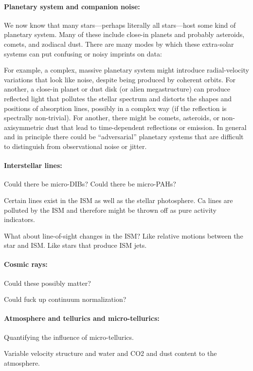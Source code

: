 \documentclass[12pt, fullpage, letterpaper]{article}
\begin{document}
\paragraph{Planetary system and companion noise:}
We now know that many stars---perhaps literally all stars---host some
kind of planetary system.
Many of these include close-in planets and probably asteroids, comets,
and zodiacal dust.
There are many modes by which these extra-solar systems can put
confusing or noisy imprints on \EPRV data:

For example, a complex, massive planetary system might introduce
radial-velocity variations that look like noise, despite being
produced by coherent orbits.
For another, a close-in planet or dust disk (or alien
megastructure) can produce reflected light that pollutes the stellar
spectrum and distorts the shapes and positions of absorption lines,
possibly in a complex way (if the reflection is spectrally
non-trivial).
For another, there might be comets, asteroids, or non-axisymmetric
dust that lead to time-dependent reflections or emission.
In general and in principle there could be ``adversarial'' planetary
systems that are difficult to distinguish from observational noise or
jitter.

\paragraph{Interstellar lines:}
Could there be micro-DIBs? Could there be micro-PAHs?

Certain lines exist in the ISM as well as the stellar photosphere. Ca
lines are polluted by the ISM and therefore might be thrown off as
pure activity indicators.

What about line-of-sight changes in the ISM? Like relative motions
between the star and ISM. Like stars that produce ISM jets.

\paragraph{Cosmic rays:}
Could these possibly matter?

Could fuck up continuum normalization?

\paragraph{Atmosphere and tellurics and micro-tellurics:}
Quantifying the influence of micro-tellurics.

Variable velocity structure and water and CO2 and dust content to the atmosphere.
\end{document}
